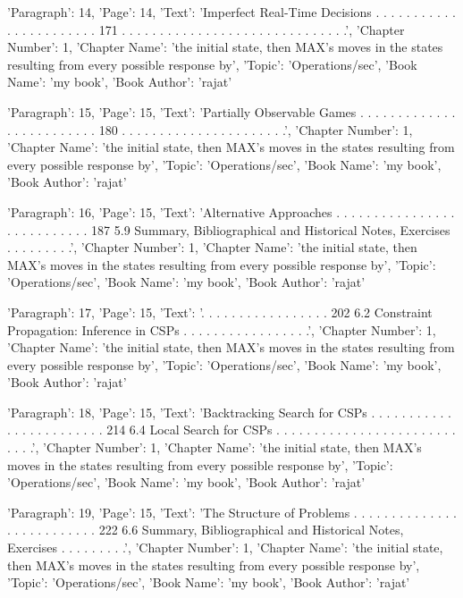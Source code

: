 {'Paragraph': 14, 'Page': 14, 'Text': 'Imperfect Real-Time Decisions . . . . . . . . . . . . . . . . . . . . . . . 171 . . . . . . . . . . . . . . . . . . . . . . . . . . . . . .', 'Chapter Number': 1, 'Chapter Name': 'the initial state, then MAX’s moves in the states resulting from every possible response by', 'Topic': 'Operations/sec', 'Book Name': 'my book', 'Book Author': 'rajat'}

{'Paragraph': 15, 'Page': 15, 'Text': 'Partially Observable Games . . . . . . . . . . . . . . . . . . . . . . . . . 180 . . . . . . . . . . . . . . . . . . . . . .', 'Chapter Number': 1, 'Chapter Name': 'the initial state, then MAX’s moves in the states resulting from every possible response by', 'Topic': 'Operations/sec', 'Book Name': 'my book', 'Book Author': 'rajat'}

{'Paragraph': 16, 'Page': 15, 'Text': 'Alternative Approaches . . . . . . . . . . . . . . . . . . . . . . . . . . . 187 5.9 Summary, Bibliographical and Historical Notes, Exercises . . . . . . . . .', 'Chapter Number': 1, 'Chapter Name': 'the initial state, then MAX’s moves in the states resulting from every possible response by', 'Topic': 'Operations/sec', 'Book Name': 'my book', 'Book Author': 'rajat'}

{'Paragraph': 17, 'Page': 15, 'Text': '. . . . . . . . . . . . . . . . . 202 6.2 Constraint Propagation: Inference in CSPs . . . . . . . . . . . . . . . . .', 'Chapter Number': 1, 'Chapter Name': 'the initial state, then MAX’s moves in the states resulting from every possible response by', 'Topic': 'Operations/sec', 'Book Name': 'my book', 'Book Author': 'rajat'}

{'Paragraph': 18, 'Page': 15, 'Text': 'Backtracking Search for CSPs . . . . . . . . . . . . . . . . . . . . . . . . 214 6.4 Local Search for CSPs . . . . . . . . . . . . . . . . . . . . . . . . . . . .', 'Chapter Number': 1, 'Chapter Name': 'the initial state, then MAX’s moves in the states resulting from every possible response by', 'Topic': 'Operations/sec', 'Book Name': 'my book', 'Book Author': 'rajat'}

{'Paragraph': 19, 'Page': 15, 'Text': 'The Structure of Problems . . . . . . . . . . . . . . . . . . . . . . . . . . 222 6.6 Summary, Bibliographical and Historical Notes, Exercises . . . . . . . . .', 'Chapter Number': 1, 'Chapter Name': 'the initial state, then MAX’s moves in the states resulting from every possible response by', 'Topic': 'Operations/sec', 'Book Name': 'my book', 'Book Author': 'rajat'}

